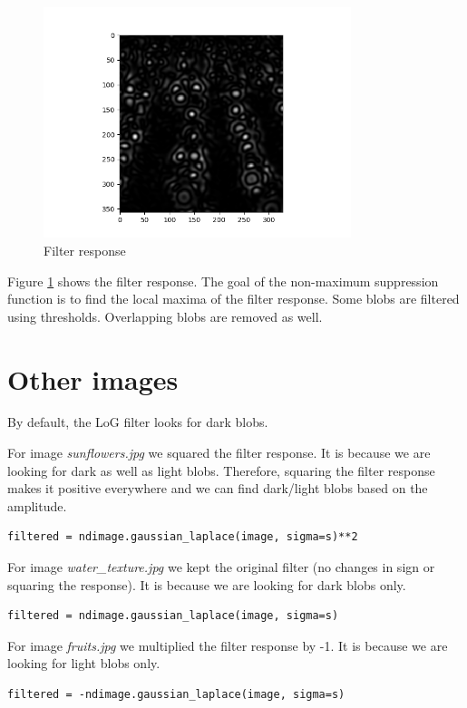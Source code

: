 \documentclass{article}
\begin{document}
\begin{figure}[H]
\centering
\includegraphics[width=0.8\textwidth]{figs/filter_response.png}
\caption{Filter response}
\label{fig:filter_resp}
\end{figure}
Figure \ref{fig:filter_resp} shows the filter response. The goal of the non-maximum suppression function is to find the local maxima of the filter response. Some blobs are filtered using thresholds. Overlapping blobs are removed as well.



\section{Other images}
By default, the LoG filter looks for dark blobs.

For image \textit{sunflowers.jpg} we squared the filter response. It is because we are looking for dark as well as light blobs. Therefore, squaring the filter response makes it positive everywhere and we can find dark/light blobs based on the amplitude.
\begin{verbatim}
filtered = ndimage.gaussian_laplace(image, sigma=s)**2
\end{verbatim}

\vspace*{0.5cm}
For image \textit{water\_texture.jpg} we kept the original filter (no changes in sign or squaring the response). It is because we are looking for dark blobs only. 
\begin{verbatim}
filtered = ndimage.gaussian_laplace(image, sigma=s)
\end{verbatim}

\vspace*{0.5cm}
For image \textit{fruits.jpg} we multiplied the filter response by -1. It is because we are looking for light blobs only.
\begin{verbatim}
filtered = -ndimage.gaussian_laplace(image, sigma=s)
\end{verbatim}     
\end{document}
